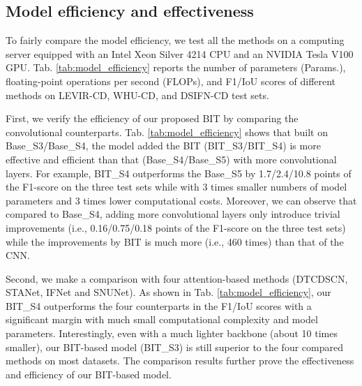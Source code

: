 \documentclass[journal]{IEEEtran}
\begin{document}
\subsection{Model efficiency and effectiveness}

To fairly compare the model efficiency, we test all the methods on a computing server equipped with an Intel Xeon Silver 4214 CPU and an NVIDIA Tesla V100 GPU. Tab. \ref{tab:model_efficiency} reports the number of parameters (Params.), floating-point operations per second (FLOPs), and F1/IoU scores of different methods on LEVIR-CD, WHU-CD, and DSIFN-CD test sets. 

First, we verify the efficiency of our proposed BIT by comparing the convolutional counterparts. Tab. \ref{tab:model_efficiency} shows that built on Base\_S3/Base\_S4, the model added the BIT (BIT\_S3/BIT\_S4) is more effective and efficient than that (Base\_S4/Base\_S5) with more convolutional layers. For example, BIT\_S4 outperforms the Base\_S5 by 1.7/2.4/10.8 points of the F1-score on the three test sets while with 3 times smaller numbers of model parameters and 3 times lower computational costs. Moreover, we can observe that compared to Base\_S4, adding more convolutional layers only introduce trivial improvements (i.e., 0.16/0.75/0.18 points of the F1-score on the three test sets) while the improvements by BIT is much more (i.e., 460 times) than that of the CNN.

Second, we make a comparison with four attention-based methods (DTCDSCN, STANet, IFNet and SNUNet). As shown in Tab. \ref{tab:model_efficiency}, our BIT\_S4 outperforms the four counterparts in the F1/IoU scores with a significant margin with much small computational complexity and model parameters. Interestingly, even with a much lighter backbone (about 10 times smaller), our BIT-based model (BIT\_S3) is still superior to the four compared methods on most datasets. The comparison results further prove the effectiveness and efficiency of our BIT-based model. 
\end{document}
